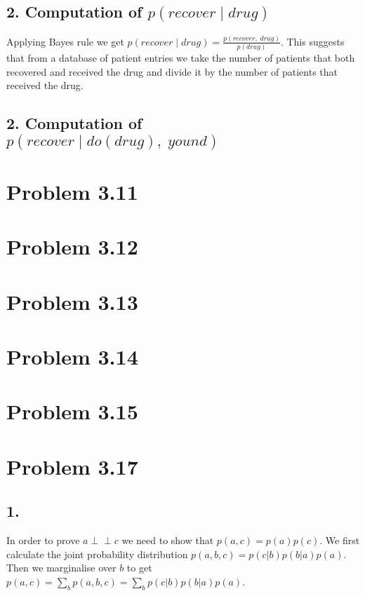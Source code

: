 \documentclass[11pt,a4paper,oneside]{report}
\newcommand\ci{\perp\!\!\!\perp}
\begin{document}
\subsection*{2. Computation of $p(recover \; | \; drug)$}

Applying Bayes rule we get $p(recover \; | \; drug) = \frac{p(recover, \;drug)}{p(drug)}$. This suggests that from a database of patient entries we take the number of patients that both recovered and received the drug and divide it by the number of patients that received the drug. 

\subsection*{2. Computation of $p(recover \; | \; do(drug),\; yound)$}

\section*{Problem 3.11}


\section*{Problem 3.12}


\section*{Problem 3.13}


\section*{Problem 3.14}


\section*{Problem 3.15}


\section*{Problem 3.17}

\subsection*{1.}

In order to prove $a \ci c$ we need to show that $p(a,c) = p(a)p(c)$. We first calculate the joint probability distribution $p(a,b,c) = p(c|b)p(b|a)p(a)$. Then we marginalise over $b$ to get $p(a,c)=\sum_{b} p(a,b,c) = \sum_{b} p(c|b)p(b|a)p(a)$. 
\end{document}
